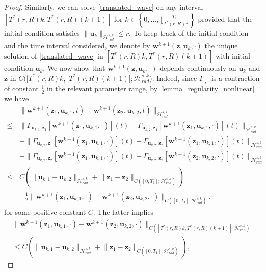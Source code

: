 \documentclass[12pt,reqno]{amsart}
\theoremstyle{plain}
\theoremstyle{remark}
\theoremstyle{plain}
\theoremstyle{definition}
\numberwithin{equation}{section}
\numberwithin{equation}{section}
\newcommand{\HH}{\mathcal{H}}
\begin{document}
\begin{proof}
		Similarly, we can solve \eqref{translated_wave} on any interval $[T^{*}(r,R)k,T^{*}(r,R)(k+1)]$ for $k\in \left\{0,\dots, \lfloor \frac{T_1}{T^{*}(r,R)}\rfloor \right\}$ provided that the initial condition satisfies $\lVert \mathbf{u}_{k}\rVert_{\HH_{rad}^{s,k}}\leq r. $ To keep track of the initial condition and the time interval considered, we denote by $\mathbf{w}^{k+1}(\mathbf{z},\mathbf{u}_k,\cdot)$ the unique solution of \eqref{translated_wave} in $[T^{*}(r,R)k,T^{*}(r,R)(k+1)]$ with initial condition $\mathbf{u}_{k}. $ We now show that $\mathbf{w}^{k+1}(\mathbf{z},\mathbf{u}_k,\cdot)$ depends continuously on $\mathbf{u}_k$ and $\mathbf{z}$ in $C([T^{*}(r,R)k,$ $T^{*}(r,R)(k+1)];\HH_{rad}^{s,k})$. Indeed, since $\Gamma_{\cdot,\cdot}$ is a contraction of constant $\frac{1}{2}$ in the relevant parameter range, by \autoref{lemma_regularity_nonlinear} we have
		\begin{align*}
			&\lVert \mathbf{w}^{k+1}(\mathbf{z}_1,\mathbf{u}_{k,1},t)-\mathbf{w}^{k+1}(\mathbf{z}_2,\mathbf{u}_{k,2},t)  \rVert_{\HH_{rad}^{s,k}}\\ \leq \, & \lVert \Gamma_{\mathbf{u}_{k,1},\mathbf{z}_1} [\mathbf{w}^{k+1}(\mathbf{z}_1,\mathbf{u}_{k,1},\cdot)](t)-\Gamma_{\mathbf{u}_{k,2},\mathbf{z}_1} [\mathbf{w}^{k+1}(\mathbf{z}_1,\mathbf{u}_{k,1},\cdot)](t)  \rVert_{\HH_{rad}^{s,k}}\\ & +\lVert \Gamma_{\mathbf{u}_{k,2},\mathbf{z}_1} [\mathbf{w}^{k+1}(\mathbf{z}_1,\mathbf{u}_{k,1},\cdot)](t)-\Gamma_{\mathbf{u}_{k,2},\mathbf{z}_2} [\mathbf{w}^{k+1}(\mathbf{z}_1,\mathbf{u}_{k,1},\cdot)](t)  \rVert_{\HH_{rad}^{s,k}}\\ & +\lVert \Gamma_{\mathbf{u}_{k,2},\mathbf{z}_2} [\mathbf{w}^{k+1}(\mathbf{z}_1,\mathbf{u}_{k,1},\cdot)](t)-\Gamma_{\mathbf{u}_{k,2},\mathbf{z}_2} [\mathbf{w}^{k+1}(\mathbf{z}_2,\mathbf{u}_{k,2},\cdot)](t)  \rVert_{\HH_{rad}^{s,k}}\\  \leq \, &  C\left(\lVert \mathbf{u}_{k,1}-\mathbf{u}_{k,2}\rVert_{\HH_{rad}^{s,k}}+\lVert \mathbf{z}_1-\mathbf{z}_2\rVert_{C([0,T_1];\HH_{rad}^{s,k})}\right)\\ &+\frac{1}{2}\lVert \mathbf{w}^{k+1}(\mathbf{z}_1,\mathbf{u}_{k,1},\cdot)-\mathbf{w}^{k+1}(\mathbf{z}_2,\mathbf{u}_{k,2},\cdot)  \rVert_{C([0,T_1];\HH_{rad}^{s,k})},
		\end{align*}
		for some positive constant $C$. The latter implies
		\begin{multline}\label{continuity_estimate}
			\lVert \mathbf{w}^{k+1}(\mathbf{z}_1,\mathbf{u}_{k,1},\cdot)-\mathbf{w}^{k+1}(\mathbf{z}_2,\mathbf{u}_{k,2},\cdot)  \rVert_{C([T^{*}(r,R)k,T^{*}(r,R)(k+1)];\HH_{rad}^{s,k})}\\ \leq C\left(\lVert \mathbf{u}_{k,1}-\mathbf{u}_{k,2}\rVert_{\HH_{rad}^{s,k}}+\lVert \mathbf{z}_1-\mathbf{z}_2\rVert_{C([0,T_1];\HH_{rad}^{s,k})}\right),

\end{multline}
\end{proof}
\end{document}
